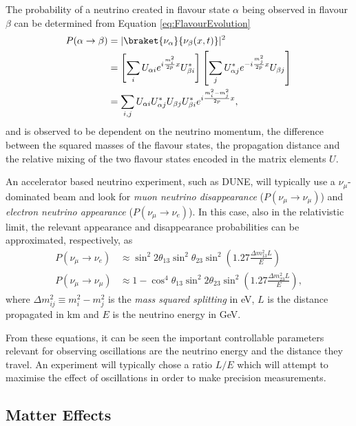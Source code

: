 The probability of a neutrino created in flavour state $\alpha$ being observed in flavour $\beta$ can be determined from Equation \ref{eq:FlavourEvolution}
\begin{align}
  P(\alpha \rightarrow \beta) &= |\braket{\nu_{\alpha}}{\nu_{\beta}(x,t)}|^2 \\
  &= \left[ \sum_i U_{\alpha i} e^{i \frac{m_i^2}{2p} x} U_{\beta i}^* \right] \left[ \sum_j U_{\alpha j}^* e^{-i \frac{m_j^2}{2p} x} U_{\beta j} \right] \\
  &= \sum_{i,j} U_{\alpha i} U_{\alpha j}^* U_{\beta j} U_{\beta i}^* e^{i \frac{m_i^2-m_j^2}{2p} x},
\end{align}
and is observed to be dependent on the neutrino momentum, the difference between the squared masses of the flavour states, the propagation distance and the relative mixing of the two flavour states encoded in the matrix elements $U$.

An accelerator based neutrino experiment, such as DUNE, will typically use a $\nu_{\mu}$-dominated beam and look for \textit{muon neutrino disappearance} ($P(\nu_{\mu}\rightarrow \nu_{\mu})$) and \textit{electron neutrino appearance} ($P(\nu_{\mu}\rightarrow \nu_e)$).  In this case, also in the relativistic limit, the relevant appearance and disappearance probabilities can be approximated, respectively, as
\begin{align}
  \label{eq:ElectronNeutrinoAppearance} P(\nu_{\mu} \rightarrow \nu_e) &\approx \sin^2{2\theta_{13}} \sin^2{\theta_{23}} \sin^2 {\left( 1.27 \frac{\Delta m_{13}^2 L}{E} \right)} \\
  \label{eq:MuonNeutrinoDisappearance} P(\nu_{\mu} \rightarrow \nu_{\mu}) &\approx 1 - \cos^4{\theta_{13}} \sin^2{2\theta_{23}} \sin^2{ \left( 1.27 \frac{\Delta m_{23}^2 L}{E} \right) },
\end{align}
where $\Delta m_{ij}^2 \equiv m_i^2-m_j^2$ is the \textit{mass squared splitting} in eV, $L$ is the distance propagated in km and $E$ is the neutrino energy in GeV.

From these equations, it can be seen the important controllable parameters relevant for observing oscillations are the neutrino energy and the distance they travel.  An experiment will typically chose a ratio $L/E$ which will attempt to maximise the effect of oscillations in order to make precision measurements.

\subsection{Matter Effects}\label{sec:MatterEffects}

